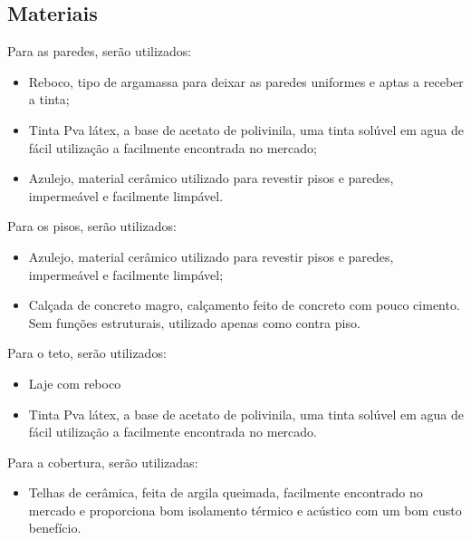         \subsection{Materiais}
            \par Para as paredes, serão utilizados:
                \begin{itemize}
                    \item Reboco, tipo de argamassa para deixar as paredes uniformes e aptas a receber a tinta;
                    \item Tinta Pva látex, a base de acetato de polivinila, uma tinta solúvel em agua de fácil utilização a facilmente encontrada no mercado;
                    \item Azulejo, material cerâmico utilizado para revestir pisos e paredes, impermeável e facilmente limpável.
                \end{itemize}
            \par Para os pisos, serão utilizados:
                \begin{itemize}
                    \item Azulejo, material cerâmico utilizado para revestir pisos e paredes, impermeável e facilmente limpável;
                    \item Calçada de concreto magro, calçamento feito de concreto com pouco cimento. Sem funções estruturais, utilizado apenas como contra piso.
                \end{itemize}
            \par Para o teto, serão utilizados:
                \begin{itemize}
                    \item Laje com reboco
                    \item Tinta Pva látex, a base de acetato de polivinila, uma tinta solúvel em agua de fácil utilização a facilmente encontrada no mercado.
                \end{itemize}
            \par Para a cobertura, serão utilizadas:
                \begin{itemize}
                    \item Telhas de cerâmica, feita de argila queimada, facilmente encontrado no mercado e proporciona bom isolamento térmico e acústico com um bom custo benefício.
                \end{itemize}

